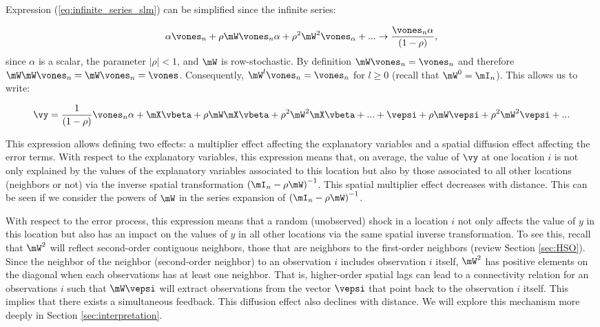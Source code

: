 \documentclass[english,12pt]{book}\usepackage[]{graphicx}\usepackage[]{xcolor}
\begin{document}
Expression (\ref{eq:infinite_series_slm}) can be simplified since the infinite series:

\begin{equation*}
\alpha\vones_n + \rho\mW\vones_n\alpha + \rho^2\mW^2\vones_\alpha + ... \to \frac{\vones_n\alpha}{\left(1 - \rho\right)},
\end{equation*}
%
since $\alpha$ is a scalar, the parameter $\left|\rho\right|  < 1$, and $\mW$ is row-stochastic. By definition $\mW\vones_n = \vones_n$ and therefore $\mW\mW\vones_n = \mW\vones_n = \vones$. Consequently, $\mW^l\vones_n = \vones_n$ for $l\geq 0$ (recall that $\mW^0 = \mI_n$). This allows us to write:

\begin{equation*}
\vy = \frac{1}{(1-\rho)}\vones_n\alpha + \mX\vbeta + \rho\mW\mX\vbeta + \rho^2\mW^2\mX\vbeta + ... + \vepsi + \rho\mW\vepsi + \rho^2\mW^2\vepsi + ...
\end{equation*}

This expression allows defining two effects: a multiplier effect affecting the explanatory variables and a spatial diffusion effect affecting the error terms. With respect to the explanatory variables, this expression means that, on average, the value of $\vy$ at one location $i$ is not only explained by the values of the explanatory variables associated to this location but also by those associated to all other locations (neighbors or not) via the inverse spatial transformation $\left(\mI_n - \rho \mW\right)^{-1}$. This spatial multiplier effect decreases with distance. This can be seen if we consider the powers of $\mW$ in the series expansion of $\left(\mI_n - \rho \mW\right)^{-1}$. 

With respect to the error process, this expression means that a random (unobserved) shock in a location $i$ not only affects the value of $y$ in this location but also has an impact on the values of $y$ in all other locations via the same spatial inverse transformation. To see this, recall that $\mW^2$ will reflect second-order contiguous neighbors, those that are neighbors to the first-order neighbors (review Section \ref{sec:HSO}). Since the neighbor of the neighbor (second-order neighbor) to an observation $i$ includes observation $i$ itself, $\mW^2$ has positive elements on the diagonal when each observations has at least one neighbor. That is, higher-order spatial lags can lead to a connectivity relation for an observations $i$ such that $\mW\vepsi$ will extract observations from the vector $\vepsi$ that point back to the observation $i$ itself. This implies that there exists a simultaneous feedback. This diffusion effect also declines with distance. We will explore this mechanism more deeply in Section \ref{sec:interpretation}.
\end{document}

